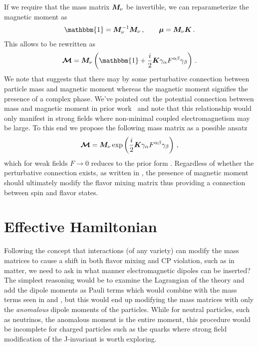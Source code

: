 If we require that the mass matrix $\boldsymbol{M}_{\nu}$ be invertible, we can reparameterize the magnetic moment as 
\begin{align}
	\label{invert:1}
    \mathbbm{1} = \bb{M}_{\nu}^{-1}\bb{M}_{\nu}\,,\qquad
    \bb{\mu} = \bb{M}_{\nu}\bb{K}\,.
\end{align}
This allows  to be rewritten as
\begin{alignat}{1}
	\label{invert:2} {\bb{\mathcal{M}}} = \bb{M}_{\nu}\left(\mathbbm{1} + \frac{i}{2}\bb{K}\gamma_{\alpha}F^{\alpha\beta}\gamma_{\beta}\right)\,.
\end{alignat}
We note that  suggests that there may by some perturbative connection between particle mass and magnetic moment whereas the magnetic moment signifies the presence of a complex phase. We've pointed out the potential connection between mass and magnetic moment in prior work~\citep{steinmetz2018magnetic} and note that this relationship would only manifest in strong fields where non-minimal coupled electromagnetism may be large. To this end we propose the following mass matrix as a possible ansatz
\begin{alignat}{1}
	\label{mass:eq:10} {\boldsymbol{\mathcal{M}}} = \boldsymbol{M}_{\nu}\,\mathrm{exp}\left(\frac{i}{2}\boldsymbol{K}\gamma_{\alpha}F^{\alpha\beta}\gamma_{\beta}\right)\,,
\end{alignat}
which for weak fields $F\rightarrow0$ reduces to the prior form . Regardless of whether the perturbative connection exists, as written in , the presence of magnetic moment should ultimately modify the flavor mixing matrix thus providing a connection between spin and flavor states.

\section{Effective Hamiltonian}\label{sec:effective}
\noindent Following the concept that interactions (of any variety) can modify the mass matrices to cause a shift in both flavor mixing and CP violation, such as in matter, we need to ask in what manner electromagnetic dipoles can be inserted? The simplest reasoning would be to examine the Lagrangian of the theory and add the dipole moments as Pauli terms \ar which would combine with the mass terms seen in  and , but this would end up modifying the mass matrices with only the \emph{anomalous} dipole moments of the particles. While for neutral particles, such as neutrinos, the anomalous moment is the entire moment, this procedure would be incomplete for charged particles such as the quarks where strong field modification of the J-invariant is worth exploring.

